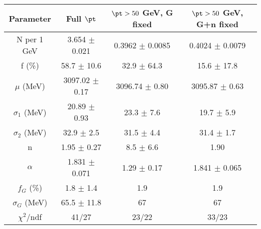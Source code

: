 \begin{tabular}{c||c|c|c}
Parameter & Full $\pt$ & $\pt>50$ GeV, G fixed & $\pt>50$ GeV, G+n fixed \\
\hline
N per 1 GeV & 3.654 $\pm$ 0.021 & 0.3962 $\pm$ 0.0085 & 0.4024 $\pm$ 0.0079\\
f (\%) & 58.7 $\pm$ 10.6 & 32.9 $\pm$ 64.3 & 15.6 $\pm$ 17.8\\
$\mu$ (MeV) & 3097.02 $\pm$ 0.17 & 3096.74 $\pm$ 0.80 & 3095.87 $\pm$ 0.63\\
$\sigma_1$ (MeV) & 20.89 $\pm$ 0.93 & 23.3 $\pm$ 7.6 & 19.7 $\pm$ 5.9\\
$\sigma_2$ (MeV) & 32.9 $\pm$ 2.5 & 31.5 $\pm$ 4.4 & 31.4 $\pm$ 1.7\\
n & 1.95 $\pm$ 0.27 & 8.5 $\pm$ 6.6 & 1.90\\
$\alpha$ & 1.831 $\pm$ 0.071 & 1.29 $\pm$ 0.17 & 1.841 $\pm$ 0.065\\
$f_G$ (\%) & 1.8 $\pm$ 1.4 & 1.9 & 1.9\\
$\sigma_G$ (MeV) & 65.5 $\pm$ 11.8 & 67 & 67\\
\hline
$\chi^2$/ndf & 41/27 & 23/22 & 33/23\\
\end{tabular}
